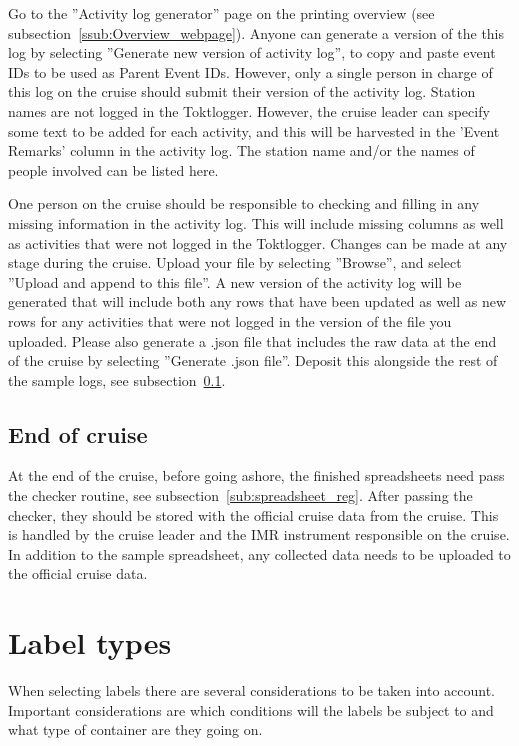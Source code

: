 \documentclass[a4paper,english, 11pt]{article}
\begin{document}
Go to the ''Activity log generator'' page on the printing overview (see subsection~\ref{ssub:Overview_webpage}). Anyone can generate a version of the this log by selecting ''Generate new version of activity log'', to copy and paste event IDs to be used as Parent Event IDs. However, only a single person in charge of this log on the cruise should submit their version of the activity log. Station names are not logged in the Toktlogger. However, the cruise leader can specify some text to be added for each activity, and this will be harvested in the 'Event Remarks' column in the activity log. The station name and/or the names of people involved can be listed here.

One person on the cruise should be responsible to checking and filling in any missing information in the activity log. This will include missing columns as well as activities that were not logged in the Toktlogger. Changes can be made at any stage during the cruise. Upload your file by selecting ''Browse'', and select ''Upload and append to this file''. A new version of the activity log will be generated that will include both any rows that have been updated as well as new rows for any activities that were not logged in the version of the file you uploaded. Please also generate a .json file that includes the raw data at the end of the cruise by selecting ''Generate .json file''. Deposit this alongside the rest of the sample logs, see subsection~\ref{sub:end_of_cruise}.  

\subsection{End of cruise} %
\label{sub:end_of_cruise}

At the end of the cruise, before going ashore, the finished spreadsheets need pass the checker routine, see subsection~\ref{sub:spreadsheet_reg}. After passing the checker, they should be stored with the official cruise data from the cruise. This is handled by the cruise leader and the IMR instrument responsible on the cruise. In addition to the sample spreadsheet, any collected data needs to be uploaded to the official cruise data.

\section{Label types} %
\label{sub:Labels}

When selecting labels there are several considerations to be taken into account. Important considerations are which conditions will the labels be subject to and what type of container are they going on.
\end{document}
